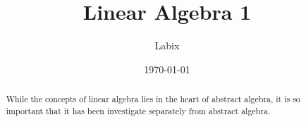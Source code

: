 \documentclass[a4paper]{article}
\title{Linear Algebra 1}
\author{Labix}
\date{\today}
\begin{document}
\maketitle
\begin{abstract}
While the concepts of linear algebra lies in the heart of abstract algebra, it is so important that it has been investigate separately from abstract algebra. 
\end{abstract}
\tableofcontents
\pagebreak

\end{document}
